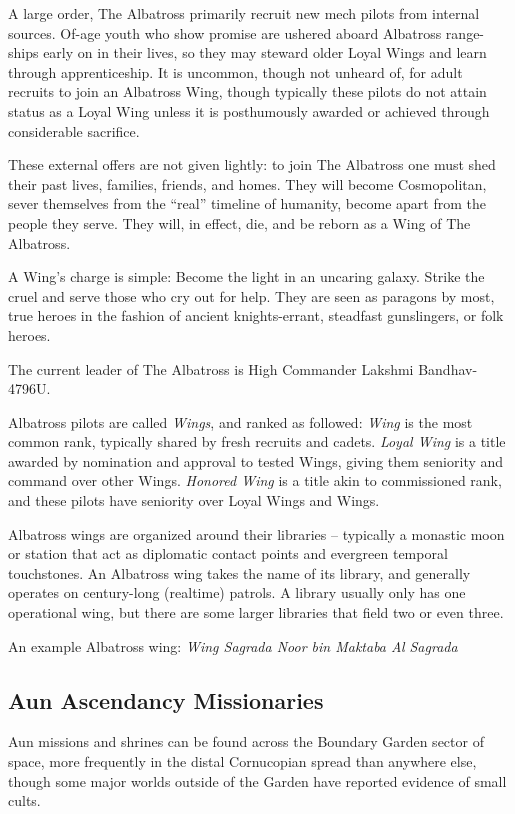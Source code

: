 A large order, The Albatross primarily recruit new mech pilots from internal
sources. Of-age youth who show promise are ushered aboard Albatross range-ships
early on in their lives, so they may steward older Loyal Wings and learn through
apprenticeship. It is uncommon, though not unheard of, for adult recruits to
join an Albatross Wing, though typically these pilots do not attain status as a
Loyal Wing unless it is posthumously awarded or achieved through considerable
sacrifice.

These external offers are not given lightly: to join The Albatross one must shed
their past lives, families, friends, and homes. They will become Cosmopolitan,
sever themselves from the ``real'' timeline of humanity, become apart from the
people they serve. They will, in effect, die, and be reborn as a Wing of The
Albatross.

A Wing's charge is simple: Become the light in an uncaring galaxy. Strike the
cruel and serve those who cry out for help. They are seen as paragons by most,
true heroes in the fashion of ancient knights-errant, steadfast gunslingers, or
folk heroes.

The current leader of The Albatross is High Commander Lakshmi Bandhav-4796U.

Albatross pilots are called \textit{Wings}, and ranked as followed: \textit{Wing} is the most
common rank, typically shared by fresh recruits and cadets. \textit{Loyal Wing} is a
title awarded by nomination and approval to tested Wings, giving them seniority
and command over other Wings. \textit{Honored Wing} is a title akin to commissioned rank,
and these pilots have seniority over Loyal Wings and Wings.

Albatross wings are organized around their libraries -- typically a monastic
moon or station that act as diplomatic contact points and evergreen temporal
touchstones. An Albatross wing takes the name of its library, and generally
operates on century-long (realtime) patrols. A library usually only has one
operational wing, but there are some larger libraries that field two or even
three.

An example Albatross wing: \textit{Wing Sagrada Noor bin Maktaba Al Sagrada}

\subsection{Aun Ascendancy Missionaries}

Aun missions and shrines can be found across the Boundary Garden sector of space, more
frequently in the distal Cornucopian spread than anywhere else, though some major worlds
outside of the Garden have reported evidence of small cults.

